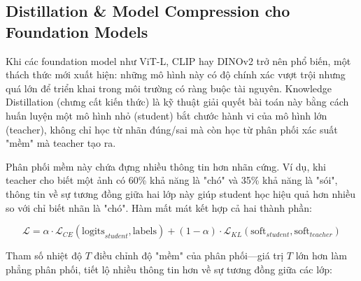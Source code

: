 \subsection{Distillation \& Model Compression cho Foundation Models}
\label{subsec:distillation}

Khi các foundation model như ViT-L, CLIP hay DINOv2 trở nên phổ biến, một thách thức mới xuất hiện: những mô hình này có độ chính xác vượt trội nhưng quá lớn để triển khai trong môi trường có ràng buộc tài nguyên. Knowledge Distillation (chưng cất kiến thức) là kỹ thuật giải quyết bài toán này bằng cách huấn luyện một mô hình nhỏ (student) bắt chước hành vi của mô hình lớn (teacher), không chỉ học từ nhãn đúng/sai mà còn học từ phân phối xác suất "mềm" mà teacher tạo ra.

Phân phối mềm này chứa đựng nhiều thông tin hơn nhãn cứng. Ví dụ, khi teacher cho biết một ảnh có 60\% khả năng là "chó" và 35\% khả năng là "sói", thông tin về sự tương đồng giữa hai lớp này giúp student học hiệu quả hơn nhiều so với chỉ biết nhãn là "chó". Hàm mất mát kết hợp cả hai thành phần:

\[ \mathcal{L} = \alpha \cdot \mathcal{L}_{CE}(\text{logits}_{student}, \text{labels}) + (1-\alpha) \cdot \mathcal{L}_{KL}(\text{soft}_{student}, \text{soft}_{teacher}) \]

Tham số nhiệt độ $T$ điều chỉnh độ "mềm" của phân phối---giá trị $T$ lớn hơn làm phẳng phân phối, tiết lộ nhiều thông tin hơn về sự tương đồng giữa các lớp:

